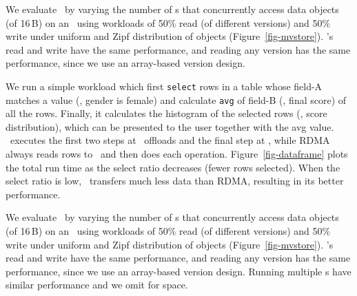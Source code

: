 We evaluate \sysmv\ by varying the number of \CN{}s that concurrently access data objects (of 16\,B) on an \MN\ using workloads of 50\% read (of different versions) and 50\% write under uniform and Zipf distribution of objects (Figure~\ref{fig-mvstore}). 
\sysmv's read and write have the same performance, and reading any version has the 
same performance, since we use an array-based version design. 




We run a simple workload which first \texttt{select} rows in a table whose field-A matches a value (\eg, gender is female)
and calculate \texttt{avg} of field-B (\eg, final score) of all the rows.
Finally, it calculates the histogram of the selected rows (\eg, score distribution), which can be presented to the user together with the avg value. %
\sys\ executes the first two steps at \MN\ offloads and the final step at \CN,
while RDMA always reads rows to \CN\ and then does each operation.
Figure~\ref{fig-dataframe} plots the total run time as the select ratio decreases (fewer rows selected).
When the select ratio is low, \sys\ transfers much less data than RDMA, resulting in its better performance.





We evaluate \sysmv\ by varying the number of \CN{}s that concurrently access data objects (of 16\,B) on an \MN\ using workloads of 50\% read (of different versions) and 50\% write under uniform and Zipf distribution of objects (Figure~\ref{fig-mvstore}). 
\sysmv's read and write have the same performance, and reading any version has the 
same performance, since we use an array-based version design. 
Running multiple \MN{}s have similar performance and we omit for space.

